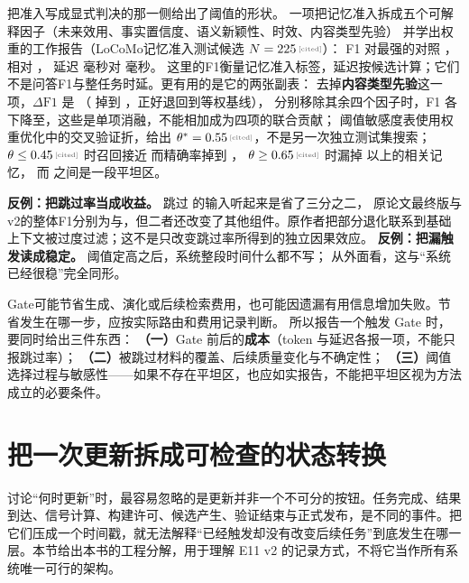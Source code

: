 \begin{sloppypar}
把准入写成显式判决的那一侧给出了阈值的形状。
一项把记忆准入拆成五个可解释因子（未来效用、事实置信度、语义新颖性、时效、内容类型先验）
并学出权重的工作报告（LoCoMo记忆准入测试候选 $N=\cited{225}$）：
F1  对最强的对照 ，相对 ，
延迟  毫秒对  毫秒\cite{amac-2603}。
这里的F1衡量记忆准入标签，延迟按候选计算；它们不是问答F1与整任务时延。更有用的是它的两张副表：
去掉\textbf{内容类型先验}这一项，$\Delta\mathrm{F1}$ 是 
（ 掉到 ，正好退回到等权基线），
分别移除其余四个因子时，F1 各下降至，这些是单项消融，不能相加成为四项的联合贡献；
阈值敏感度表使用权重优化中的交叉验证折，给出 $\theta^{*}=\cited{0.55}$，不是另一次独立测试集搜索；
$\theta\le\cited{0.45}$ 时召回接近  而精确率掉到 ，
$\theta\ge\cited{0.65}$ 时漏掉  以上的相关记忆，
而  之间是一段平坦区。
\end{sloppypar}

\begin{pitfallbox}
\textbf{反例：把跳过率当成收益。}
跳过  的输入听起来是省了三分之二，
原论文最终版与v2的整体F1分别为与，但二者还改变了其他组件。原作者把部分退化联系到基础上下文被过度过滤；这不是只改变跳过率所得到的独立因果效应。
\textbf{反例：把漏触发读成稳定。}
阈值定高之后，系统整段时间什么都不写；
从外面看，这与“系统已经很稳”完全同形。
\end{pitfallbox}

\begin{principlebox}
Gate可能节省生成、演化或后续检索费用，也可能因遗漏有用信息增加失败。节省发生在哪一步，应按实际路由和费用记录判断。
所以报告一个触发 Gate 时，要同时给出三件东西：
\textbf{（一）}Gate 前后的\textbf{成本}（token 与延迟各报一项，不能只报跳过率）；
\textbf{（二）}被跳过材料的覆盖、后续质量变化与不确定性；
\textbf{（三）}阈值选择过程与敏感性——如果不存在平坦区，也应如实报告，不能把平坦区视为方法成立的必要条件。
\end{principlebox}

\section{把一次更新拆成可检查的状态转换}
\label{sec:ch13-state-machine}

讨论“何时更新”时，最容易忽略的是更新并非一个不可分的按钮。任务完成、结果到达、信号计算、构建许可、候选产生、验证结束与正式发布，是不同的事件。把它们压成一个时间戳，就无法解释“已经触发却没有改变后续任务”到底发生在哪一层。本节给出本书的工程分解，用于理解 E11 v2 的记录方式，不将它当作所有系统唯一可行的架构。

